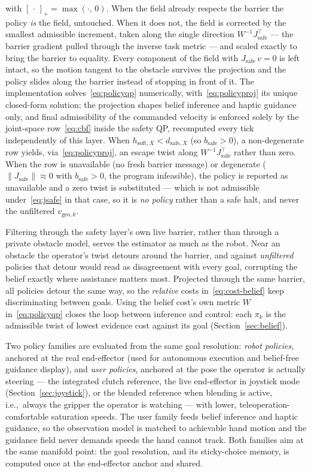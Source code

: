 \documentclass[12pt,a4paper,twoside,openright]{report}
\begin{document}
with $[\,\cdot\,]_{+} = \max(\cdot,\,0)$. When the field already respects the barrier the policy \emph{is} the field, untouched. When it does not, the field is corrected by the smallest admissible increment, taken along the single direction $W^{-1}J_{\text{safe}}^{\top}$ --- the barrier gradient pulled through the inverse task metric --- and scaled exactly to bring the barrier to equality. Every component of the field with $J_{\text{safe}}\,v = 0$ is left intact, so the motion tangent to the obstacle survives the projection and the policy slides along the barrier instead of stopping in front of it. The implementation solves~\eqref{eq:policyqp} numerically, with~\eqref{eq:policyproj} its unique closed-form solution; the projection shapes belief inference and haptic guidance only, and final admissibility of the commanded velocity is enforced solely by the joint-space row~\eqref{eq:cbf} inside the safety QP, recomputed every tick independently of this layer. When $h_{\text{soft},X} < d_{\text{safe},X}$ (so $b_{\text{safe}} > 0$), a non-degenerate row yields, via~\eqref{eq:policyproj}, an escape twist along $W^{-1}J_{\text{safe}}^{\top}$ rather than zero. When the row is unavailable (no fresh barrier message) or degenerate ($\lVert J_{\text{safe}} \rVert \approx 0$ with $b_{\text{safe}} > 0$, the program infeasible), the policy is reported as unavailable and a zero twist is substituted --- which is not admissible under~\eqref{eq:jsafe} in that case, so it is \emph{no policy} rather than a safe halt, and never the unfiltered $v_{\text{geo},k}$.

Filtering through the safety layer's own live barrier, rather than through a private obstacle model, serves the estimator as much as the robot. Near an obstacle the operator's twist detours around the barrier, and against \emph{unfiltered} policies that detour would read as disagreement with every goal, corrupting the belief exactly where assistance matters most. Projected through the same barrier, all policies detour the same way, so the \emph{relative} costs in~\eqref{eq:cost-belief} keep discriminating between goals. Using the belief cost's own metric $W$ in~\eqref{eq:policyqp} closes the loop between inference and control: each $\pi_k$ is the admissible twist of lowest evidence cost against its goal (Section~\ref{sec:belief}).

Two policy families are evaluated from the same goal resolution: \emph{robot policies}, anchored at the real end-effector (used for autonomous execution and belief-free guidance display), and \emph{user policies}, anchored at the pose the operator is actually steering --- the integrated clutch reference, the live end-effector in joystick mode (Section~\ref{sec:joystick}), or the blended reference when blending is active, i.e.,\ always the gripper the operator is watching --- with lower, teleoperation-comfortable saturation speeds. The user family feeds belief inference and haptic guidance, so the observation model is matched to achievable hand motion and the guidance field never demands speeds the hand cannot track. Both families aim at the same manifold point: the goal resolution, and its sticky-choice memory, is computed once at the end-effector anchor and shared.
\end{document}
